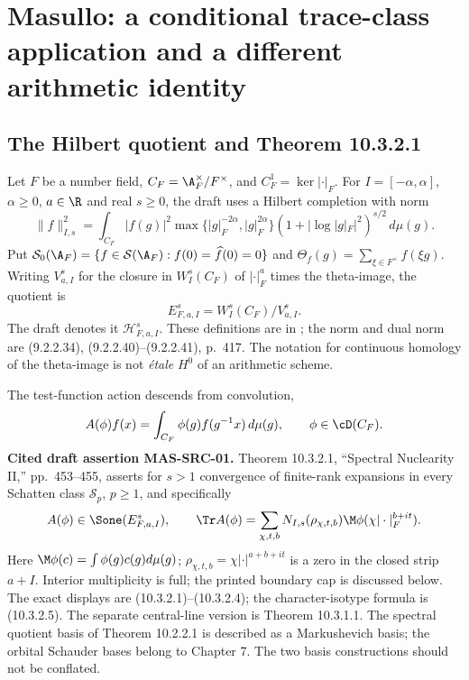 \section{Masullo: a conditional trace-class application and a different arithmetic identity}
\subsection{The Hilbert quotient and Theorem 10.3.2.1}
Let $F$ be a number field, $C_F=\A_F^\times/F^\times$, and $C_F^1=\ker|\cdot|_F$. For $I=[-\alpha,\alpha]$, $\alpha\ge0$, $a\in\R$ and real $s\ge0$, the draft uses a Hilbert completion with norm
\begin{equation}\label{eq:masnorm}
 \|f\|_{I,s}^2=\int_{C_F}|f(g)|^2
 \max\{|g|_F^{-2\alpha},|g|_F^{2\alpha}\}
 (1+|\log|g|_F|^2)^{s/2}\,d\mu(g).
\end{equation}
Put $\mathcal S_0(\A_F)=\{f\in\mathcal S(\A_F):f(0)=\widehat f(0)=0\}$ and $\Theta_f(g)=\sum_{\xi\in F^\times}f(\xi g)$. Writing $V^s_{a,I}$ for the closure in $W_I^s(C_F)$ of $|\cdot|_F^a$ times the theta-image, the quotient is
\[
 E^s_{F,a,I}=W_I^s(C_F)/V^s_{a,I}.
\]
The draft denotes it $\mathcal H^s_{F,a,I}$. These definitions are in \cite[\S1.1.3; Definition 10.1.1.1; (10.2.2.1)]{masullo}; the norm and dual norm are (9.2.2.34), (9.2.2.40)--(9.2.2.41), p.~417. The notation for continuous homology of the theta-image is not \emph{\'etale} $H^0$ of an arithmetic scheme.

The test-function action descends from convolution,
\[
 A(\phi)f(x)=\int_{C_F}\phi(g)f(g^{-1}x)\,d\mu(g),\qquad \phi\in\cD(C_F).
\]
\textbf{Cited draft assertion MAS-SRC-01.} Theorem 10.3.2.1, ``Spectral Nuclearity II,'' pp.~453--455, asserts for $s>1$ convergence of finite-rank expansions in every Schatten class $\mathcal S_p$, $p\ge1$, and specifically
\[
 A(\phi)\in\Sone(E^s_{F,a,I}),\qquad
 \Tr A(\phi)=\sum_{\chi,t,b}N_{I,s}(\rho_{\chi,t,b})
 \M\phi(\chi|\cdot|_F^{b+it}).
\]
Here $\M\phi(c)=\int\phi(g)c(g)d\mu(g)$; $\rho_{\chi,t,b}=\chi|\cdot|^{a+b+it}$ is a zero in the closed strip $a+I$. Interior multiplicity is full; the printed boundary cap is discussed below. The exact displays are (10.3.2.1)--(10.3.2.4); the character-isotype formula is (10.3.2.5). The separate central-line version is Theorem 10.3.1.1. The spectral quotient basis of Theorem 10.2.2.1 is described as a Markushevich basis; the orbital Schauder bases belong to Chapter 7. The two basis constructions should not be conflated.

